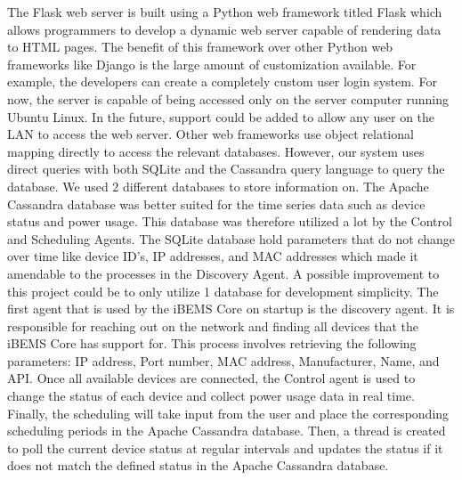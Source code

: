 The Flask web server is built using a Python web framework titled Flask which
allows programmers to develop a dynamic web server capable of rendering data to
HTML pages. The benefit of this framework over other Python web frameworks like
Django is the large amount of customization available. For example, the
developers can create a completely custom user login system. For now, the server
is capable of being accessed only on the server computer running Ubuntu Linux.
In the future, support could be added to allow any user on the LAN to access the
web server. Other web frameworks use object relational mapping directly to
access the relevant databases. However, our system uses direct queries with both
SQLite and the Cassandra query language to query the database. \medbreak We used
2 different databases to store information on. The Apache Cassandra database was
better suited for the time series data such as device status and power usage.
This database was therefore utilized a lot by the Control and Scheduling Agents.
The SQLite database hold parameters that do not change over time like device
ID's, IP addresses, and MAC addresses which made it amendable to the processes
in the Discovery Agent. A possible improvement to this project could be to only
utilize 1 database for development simplicity. \medbreak The first agent that is
used by the iBEMS Core on startup is the discovery agent. It is responsible for
reaching out on the network and finding all devices that the iBEMS Core has
support for. This process involves retrieving the following parameters: IP
address, Port number, MAC address, Manufacturer, Name, and API. Once all
available devices are connected, the Control agent is used to change the status
of each device and collect power usage data in real time. Finally, the
scheduling will take input from the user and place the corresponding scheduling
periods in the Apache Cassandra database. Then, a thread is created to poll the
current device status at regular intervals and updates the status if it does not
match the defined status in the Apache Cassandra database.


